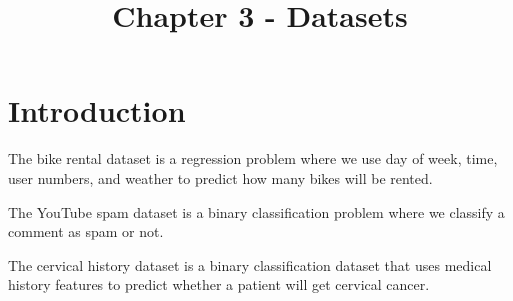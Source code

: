 \documentclass[a4paper]{article}
\title{Chapter 3 - Datasets}
\date{}
\begin{document}
\maketitle

\section{Introduction}
The bike rental dataset is a regression problem where we use day of week, time,
user numbers, and weather to predict how many bikes will be rented.

The YouTube spam dataset is a binary classification problem
where we classify a comment as spam or not.

The cervical history dataset is a binary classification dataset that uses
medical history features to predict whether a patient will get cervical cancer.
\end{document}

